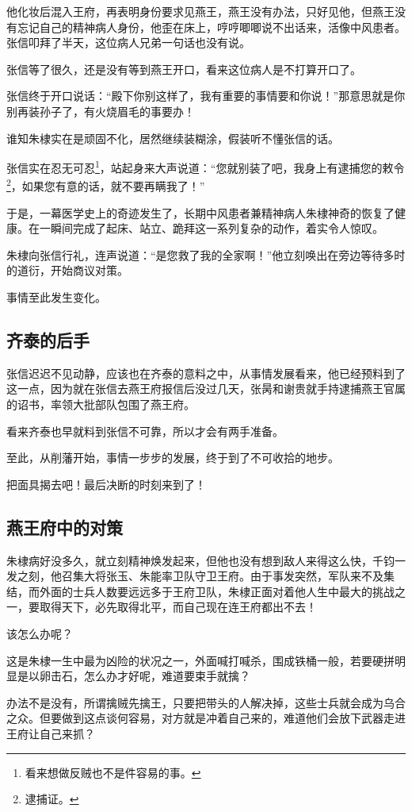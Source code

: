 \begin{multicols}{\theparacolNo}
		他化妆后混入王府，再表明身份要求见燕王，燕王没有办法，只好见他，但燕王没有忘记自己的精神病人身份，他歪在床上，哼哼唧唧说不出话来，活像中风患者。张信叩拜了半天，这位病人兄弟一句话也没有说。

		张信等了很久，还是没有等到燕王开口，看来这位病人是不打算开口了。

		张信终于开口说话：“殿下你别这样了，我有重要的事情要和你说！”那意思就是你别再装孙子了，有火烧眉毛的事要办！

		谁知朱棣实在是顽固不化，居然继续装糊涂，假装听不懂张信的话。

		张信实在忍无可忍\footnote{看来想做反贼也不是件容易的事。}，站起身来大声说道：“您就别装了吧，我身上有逮捕您的敕令\footnote{逮捕证。}，如果您有意的话，就不要再瞒我了！”

		于是，一幕医学史上的奇迹发生了，长期中风患者兼精神病人朱棣神奇的恢复了健康。在一瞬间完成了起床、站立、跪拜这一系列复杂的动作，着实令人惊叹。

		朱棣向张信行礼，连声说道：“是您救了我的全家啊！”他立刻唤出在旁边等待多时的道衍，开始商议对策。

		事情至此发生变化。

		\subsection{齐泰的后手}
		张信迟迟不见动静，应该也在齐泰的意料之中，从事情发展看来，他已经预料到了这一点，因为就在张信去燕王府报信后没过几天，张昺和谢贵就手持逮捕燕王官属的诏书，率领大批部队包围了燕王府。

		看来齐泰也早就料到张信不可靠，所以才会有两手准备。

		至此，从削藩开始，事情一步步的发展，终于到了不可收拾的地步。

		把面具揭去吧！最后决断的时刻来到了！

		\subsection{燕王府中的对策}
		朱棣病好没多久，就立刻精神焕发起来，但他也没有想到敌人来得这么快，千钧一发之刻，他召集大将张玉、朱能率卫队守卫王府。由于事发突然，军队来不及集结，而外面的士兵人数要远远多于王府卫队，朱棣正面对着他人生中最大的挑战之一，要取得天下，必先取得北平，而自己现在连王府都出不去！

		该怎么办呢？

		这是朱棣一生中最为凶险的状况之一，外面喊打喊杀，围成铁桶一般，若要硬拼明显是以卵击石，怎么办才好呢，难道要束手就擒？

		办法不是没有，所谓擒贼先擒王，只要把带头的人解决掉，这些士兵就会成为乌合之众。但要做到这点谈何容易，对方就是冲着自己来的，难道他们会放下武器走进王府让自己来抓？


\end{multicols}
